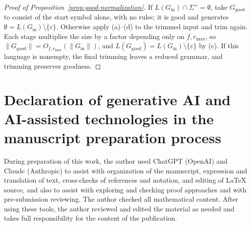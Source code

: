 \documentclass[11pt]{article}
\numberwithin{equation}{section}
\theoremstyle{plain}
\theoremstyle{definition}
\theoremstyle{remark}
\newcommand{\eps}{\varepsilon}
\theoremstyle{plain}
\begin{document}
\begin{proof}[Proof of Proposition~\ref{prop:good-normalization}]
If $L(G_{\mathrm{in}})\cap\Sigma^+=\emptyset$, take $G_{\mathrm{good}}$ to consist of the
start symbol alone, with no rules; it is good and generates
$\emptyset=L(G_{\mathrm{in}})\setminus\{\eps\}$.  Otherwise apply (a)--(d) to the trimmed
input and trim again.  Each stage multiplies the size by a
factor depending only on $f,r_{\max}$, so
$\|G_{\mathrm{good}}\|=O_{f,r_{\max}}(\|G_{\mathrm{in}}\|)$, and
$L(G_{\mathrm{good}})=L(G_{\mathrm{in}})\setminus\{\eps\}$ by (c).  If this language is
nonempty, the final trimming leaves a reduced grammar, and trimming preserves goodness.
\end{proof}

\section*{Declaration of generative AI and AI-assisted technologies in the manuscript preparation process}
During preparation of this work, the author used ChatGPT (OpenAI) and Claude
(Anthropic) to assist with organization of the manuscript, expression and
translation of text, cross-checks of references and notation, and editing of
\LaTeX{} source, and also to assist with exploring and checking proof
approaches and with pre-submission reviewing. The author checked all
mathematical content. After using these tools, the author reviewed and edited the
material as needed and takes full responsibility for the content of the publication.
\end{document}
